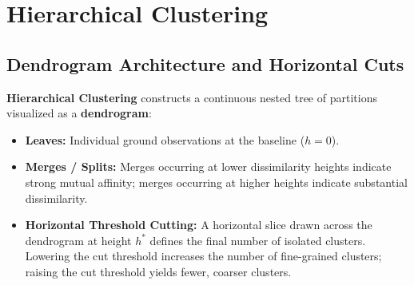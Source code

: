 \section{Hierarchical Clustering}

\subsection{Dendrogram Architecture and Horizontal Cuts}
\textbf{Hierarchical Clustering} constructs a continuous nested tree of partitions visualized as a \textbf{dendrogram}:
\begin{itemize}
    \item \textbf{Leaves:} Individual ground observations at the baseline ($h = 0$).
    \item \textbf{Merges / Splits:} Merges occurring at lower dissimilarity heights indicate strong mutual affinity; merges occurring at higher heights indicate substantial dissimilarity.
    \item \textbf{Horizontal Threshold Cutting:} A horizontal slice drawn across the dendrogram at height $h^*$ defines the final number of isolated clusters. Lowering the cut threshold increases the number of fine-grained clusters; raising the cut threshold yields fewer, coarser clusters.
\end{itemize}

